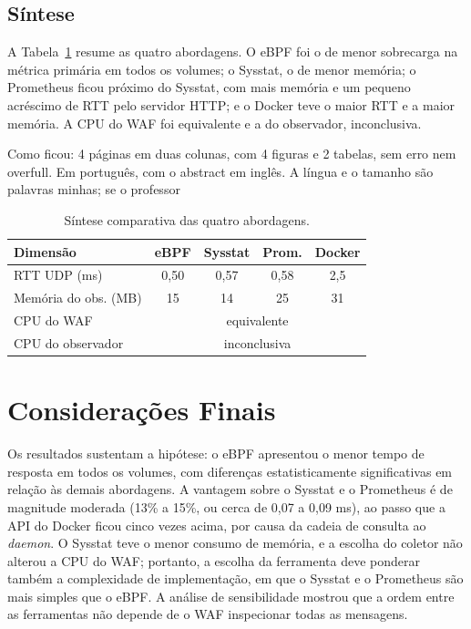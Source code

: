 \documentclass{ieeeaccess}
\begin{document}
\subsection{Síntese}
A Tabela~\ref{tab:sintese} resume as quatro abordagens. O eBPF foi o de menor sobrecarga na métrica primária em todos os volumes; o Sysstat, o de menor memória; o Prometheus ficou próximo do Sysstat, com mais memória e um pequeno acréscimo de RTT pelo servidor HTTP; e o Docker teve o maior RTT e a maior memória. A CPU do WAF foi equivalente e a do observador, inconclusiva.

\begin{table}[t]
\centering
\caption{Síntese comparativa das quatro abordagens.}
\label{tab:sintese}Como ficou: 4 páginas em duas colunas, com 4 figuras e 2 tabelas, sem erro nem overfull. Em português, com o abstract em inglês. A língua e o tamanho são palavras minhas; se o professor
\scriptsize
\setlength{\tabcolsep}{3pt}
\begin{tabular}{@{}lcccc@{}}
\toprule
Dimensão & eBPF & Sysstat & Prom. & Docker \\
\midrule
RTT UDP (ms)        & 0,50 & 0,57 & 0,58 & 2,5 \\
Memória do obs. (MB)& 15   & 14   & 25   & 31 \\
CPU do WAF          & \multicolumn{4}{c}{equivalente} \\
CPU do observador   & \multicolumn{4}{c}{inconclusiva} \\
\bottomrule
\end{tabular}
\end{table}

\section{Considerações Finais}
\label{sec:conc}
Os resultados sustentam a hipótese: o eBPF apresentou o menor tempo de resposta em todos os volumes, com diferenças estatisticamente significativas em relação às demais abordagens. A vantagem sobre o Sysstat e o Prometheus é de magnitude moderada (13\% a 15\%, ou cerca de 0,07 a 0,09 ms), ao passo que a API do Docker ficou cinco vezes acima, por causa da cadeia de consulta ao \textit{daemon}. O Sysstat teve o menor consumo de memória, e a escolha do coletor não alterou a CPU do WAF; portanto, a escolha da ferramenta deve ponderar também a complexidade de implementação, em que o Sysstat e o Prometheus são mais simples que o eBPF. A análise de sensibilidade mostrou que a ordem entre as ferramentas não depende de o WAF inspecionar todas as mensagens.
\end{document}
